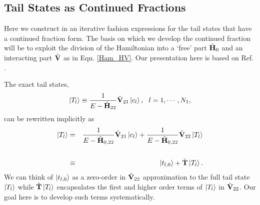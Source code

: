 \documentclass[twocolumn,secnumarabic,amssymb, nobibnotes, aps, prd]{revtex4-2}
\newcommand{\Ht}{{\hat {\bf T}}}
\newcommand{\Hhh}{\hat{\bf H}_{22}}
\newcommand{\Vhh}{\hat{\bf V}_{22}}
\newcommand{\Vhl}{\hat{\bf V}_{21}}
\newcommand{\V}{\hat{\bf V}}
\begin{document}
\subsection{Tail States as Continued Fractions}


Here we construct in an iterative fashion expressions for the tail states that have a continued fraction form.  The basis on which we develop the continued fraction will be to exploit the division of the Hamiltonian into a `free' part $\hat {\bf H}_0$ and an interacting part $\V$ as in Eqn. \eqref{Ham_HV}.  Our presentation here is based on Ref. \cite{PhysRevA.28.2151}.

The exact tail states,
\begin{equation}
    \ket{T_l} \equiv \frac{1}{E-\Hhh}\Vhl\ket{c_l}, ~~l=1,\cdots,N_1,
\end{equation}
can be rewritten implicitly as
\begin{eqnarray}
 \ket{T_l} &=& \frac{1}{E-\hat {\bf H}_{0,22}}\Vhl\ket{c_l}+\frac{1}{E-\hat {\bf H}_{0,22}}\Vhh\ket{T_l}\cr\cr
 &\equiv & \ket{t_{l,0}} + \Ht\ket{T_l}.\label{IterLinEq}
\end{eqnarray}
We can think of $\ket{t_{l,0}}$ as a zero-order in $\Vhh$ approximation to the full tail state $\ket{T_l}$ while 
$\Ht \ket{T_l}$ encapsulates the first and higher order terms of $\ket{T_l}$ in $\Vhh$.
Our goal here is to develop such terms systematically.
\end{document}
